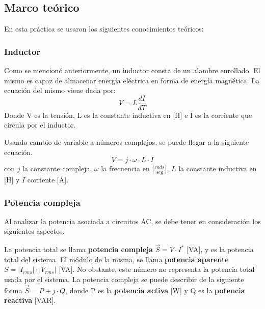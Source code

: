 \documentclass{article}
\begin{document}
        \subsection{Marco teórico}

        En esta práctica se usaron los siguientes conocimientos teóricos:

        \subsubsection{Inductor}

        Como se mencionó anteriormente, un inductor consta de un alambre enrollado. El mismo es capaz de almacenar energía eléctrica en forma de energía magnética.
         La ecuación del mismo viene dada por:
        \begin{equation*}
            V=L \frac{dI}{dT}
        \end{equation*}
        Donde V es la tensión, L es la constante inductiva en [H] e I es la corriente que circula por el inductor.

        Usando cambio de variable a números complejos, se puede llegar a la siguiente ecuación.
        \begin{equation}
            V=j\cdot \omega\cdot L \cdot I
            \label{induct}
        \end{equation}
        con $j$ la constante compleja, $\omega$ la frecuencia en [$\frac{rads}{seg}$], $L$ la constante inductiva en [H] y $I$ corriente [A].\par

        \subsubsection{Potencia compleja}

        Al analizar la potencia asociada a circuitos AC, se debe tener en consideración los siguientes aspectos.\par
        La potencia total se llama { \bfseries potencia compleja} $\vec{S}= V \cdot I^{*}$ [VA], y es la potencia total del sistema. El módulo de la misma, se llama {\bfseries potencia aparente} $S=|I_{rms}| \cdot |V_{rms}|$ [VA]. No obstante, este número no representa la potencia total usada por el sistema.
        La potencia compleja se puede describir de la siguiente forma $\vec{S}=P + j \cdot Q$, donde P es la { \bfseries potencia activa}  [W] y Q es la {\bfseries potencia reactiva} [VAR]. \par
\end{document}

